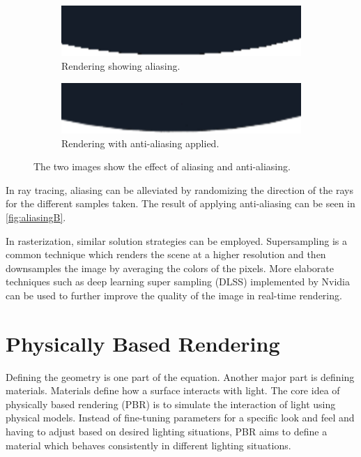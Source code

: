 \begin{figure}[H]
    \centering
    \begin{subfigure}[b]{0.45\textwidth}
        \includegraphics[width=\textwidth]{resources/aliasing.png}
        \caption{Rendering showing aliasing.}
        \label{fig:aliasingA}
    \end{subfigure}
    \hfill
    \begin{subfigure}[b]{0.45\textwidth}
        \includegraphics[width=\textwidth]{resources/anti-aliasing.png}
        \caption{Rendering with anti-aliasing applied.}
        \label{fig:aliasingB}
    \end{subfigure}
    \caption{The two images show the effect of aliasing and anti-aliasing.}
    \label{fig:aliasing}
\end{figure}

In ray tracing, aliasing can be alleviated by randomizing the direction of the rays for the different samples taken. The result of applying anti-aliasing can be seen in \autoref{fig:aliasingB}.

In rasterization, similar solution strategies can be employed. Supersampling is a common technique which renders the scene at a higher resolution and then downsamples the image by averaging the colors of the pixels. More elaborate techniques such as deep learning super sampling (DLSS) implemented by Nvidia \cite{nvidiaDlss} can be used to further improve the quality of the image in real-time rendering.

\section{Physically Based Rendering}

Defining the geometry is one part of the equation. Another major part is defining materials. Materials define how a surface interacts with light. The core idea of physically based rendering (\gls{PBR}) is to simulate the interaction of light using physical models. Instead of fine-tuning parameters for a specific look and feel and having to adjust based on desired lighting situations, \gls{PBR} aims to define a material which behaves consistently in different lighting situations.

